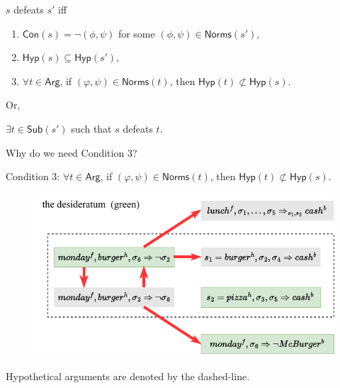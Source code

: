 \documentclass[aspectratio=169]{beamer}
\begin{document}
\begin{frame}[label={sec:org013357e},fragile]{}

\(s\) \alert{defeats} \(s'\) iff
\begin{enumerate}
	\item \(\mathsf{Con}(s) = \neg(\phi,\psi)\) for some \((\phi,\psi) \in \mathsf{Norms}(s'),\)
	\item $\mathsf{Hyp}(s)\subseteq\mathsf{Hyp}(s'),$
	\item $\forall t\in\mathsf{Arg}$, if $(\varphi,\psi)\in\mathsf{Norms}(t)$, then \(\mathsf{Hyp}(t)\not\subset\mathsf{Hyp}(s).\)
\end{enumerate}
Or, 

\(\exists t \in \mathsf{Sub}(s')\) such that \(s\) defeats \(t\).


\end{frame}

\begin{frame}
	Why do we need Condition 3?
	
Condition 3:	$\forall t\in\mathsf{Arg}$, if $(\varphi,\psi)\in\mathsf{Norms}(t)$, then \(\mathsf{Hyp}(t)\not\subset\mathsf{Hyp}(s).\)
\end{frame}

\begin{frame}
	\begin{figure}
		\centering
		\includegraphics[scale=1]{pic/figure2.pdf}
	\end{figure}
	
	Hypothetical arguments are denoted by the dashed-line.
\end{frame}
\end{document}
